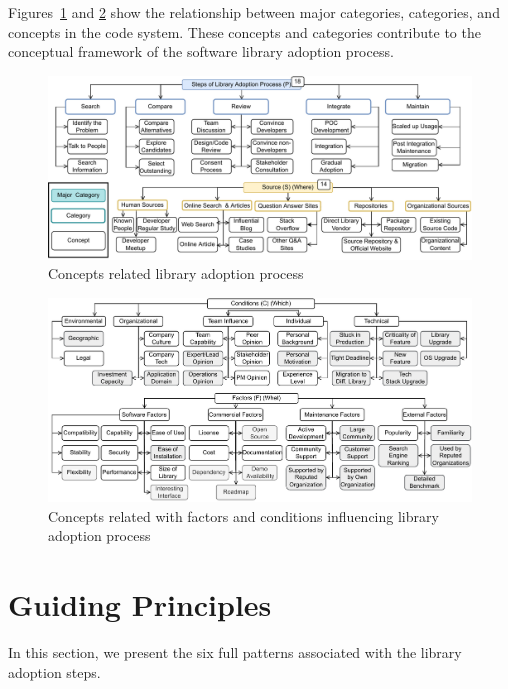 Figures~\ref{fig:process} and \ref{fig:conditions} show the relationship between major categories, categories, and concepts in the code system. These concepts and categories contribute to the conceptual framework of the software library adoption process.

\begin{figure}
    \centering
    \includegraphics[scale=0.85]{images/process.pdf}
    \caption{Concepts related library adoption process}
    \label{fig:process}
\end{figure}

\begin{figure}
    \centering
    \includegraphics[scale=0.85]{images/conditions.pdf}
    \caption{Concepts related with factors and conditions influencing library adoption process}
    \label{fig:conditions}
\end{figure}

\section{Guiding Principles}
In this section, we present the six full patterns associated with the library adoption steps.

\FloatBarrier






